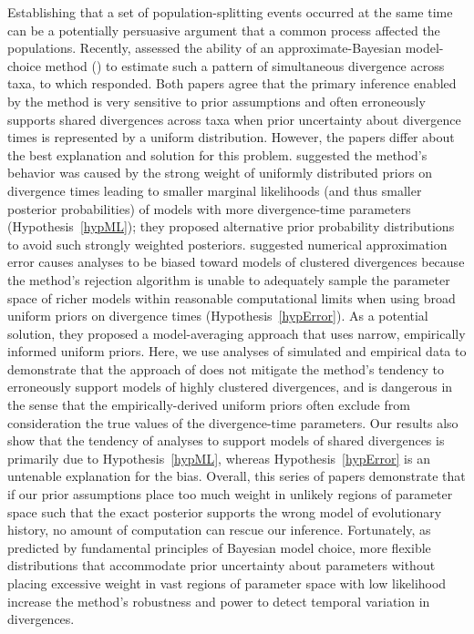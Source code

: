 Establishing that a set of population-splitting events occurred at the same
time can be a potentially persuasive argument that a common process affected
the populations.
Recently, \citet{Oaks2012} assessed the ability of an approximate-Bayesian
model-choice method (\msb) to estimate such a pattern of simultaneous
divergence across taxa, to which \citet{Hickerson2013} responded.
Both papers agree that the primary inference enabled by the method is very
sensitive to prior assumptions and often erroneously supports shared
divergences across taxa when prior uncertainty about divergence times
is represented by a uniform distribution.
However, the papers differ about the best explanation and solution for this
problem.
\citet{Oaks2012} suggested the method's behavior was caused by the strong
weight of uniformly distributed priors on divergence times leading to smaller
marginal likelihoods (and thus smaller posterior probabilities) of models with
more divergence-time parameters (Hypothesis~\ref{hypML}); they proposed
alternative prior probability distributions to avoid such strongly weighted
posteriors.
\citet{Hickerson2013} suggested numerical approximation error causes \msb
analyses to be biased toward models of clustered divergences because the
method's rejection algorithm is unable to adequately sample the parameter space
of richer models within reasonable computational limits when using broad
uniform priors on divergence times (Hypothesis~\ref{hypError}).
As a potential solution, they proposed a model-averaging approach that uses
narrow, empirically informed uniform priors.
Here, we use analyses of simulated and empirical data to demonstrate that the
approach of \citet{Hickerson2013} does not mitigate the method's tendency to
erroneously support models of highly clustered divergences, and is dangerous in
the sense that the empirically-derived uniform priors often exclude from
consideration the true values of the divergence-time parameters.
Our results also show that the tendency of \msb analyses to support models of
shared divergences is primarily due to Hypothesis~\ref{hypML}, whereas
Hypothesis~\ref{hypError} is an untenable explanation for the bias.
Overall, this series of papers demonstrate that if our prior assumptions place
too much weight in unlikely regions of parameter space such that the exact
posterior supports the wrong model of evolutionary history, no amount of
computation can rescue our inference. 
Fortunately, as predicted by fundamental principles of Bayesian model choice,
more flexible distributions that accommodate prior uncertainty about parameters
without placing excessive weight in vast regions of parameter space with low
likelihood increase the method's robustness and power to detect temporal
variation in divergences.
